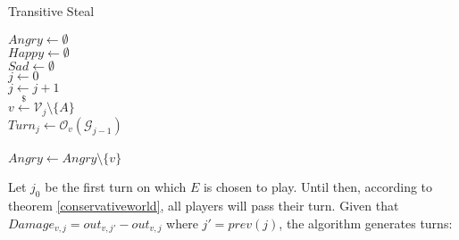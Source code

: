 \documentclass[11pt]{article}
\theoremstyle{definition}
\theoremstyle{corollary}
\theoremstyle{lemma}
\begin{document}
    \begin{algorithm}[H]
       \label{transitivesteal}
       \caption{Transitive Steal}
       $Angry \gets \emptyset$ \\
       $Happy \gets \emptyset$ \\
       $Sad \gets \emptyset$ \\
       $j \gets 0$ \\
          {$j \gets j + 1$ \\
           $v \overset{\$}{\gets} \mathcal{V}_j \setminus\{A\}$ \\
           $Turn_j \gets \mathcal{O}_v(\mathcal{G}_{j-1})$ \\ %
            \\
           $Angry \gets Angry \setminus \{v\}$ \\
           }
    \end{algorithm}
    Let $j_0$ be the first turn on which $E$ is chosen to play. Until then, according to theorem \ref{conservativeworld},
    all players will pass their turn.
    Given that $Damage_{v,j} = out_{v,j'} - out_{v,j}$ where $j' = prev(j)$, the algorithm generates turns:
\end{document}
